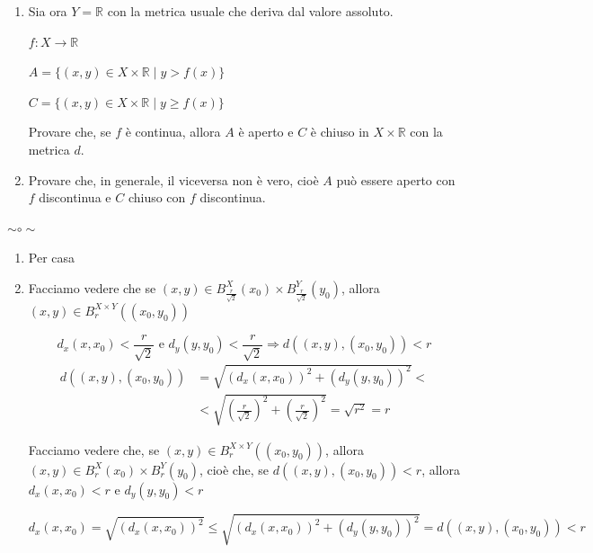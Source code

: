 \begin{exbar}
\begin{example}
\begin{enumerate}
		\item Sia ora $Y = \mathbb{R}$ con la metrica usuale che deriva dal valore assoluto.
		
		$f:X \rightarrow \mathbb{R}$
		
		$A = \{ (x,y) \in X \times \mathbb{R} \; \big| \; y > f(x) \}$
		
		$C = \{ (x,y) \in X \times \mathbb{R} \; \big| \; y \geq f(x) \}$
		
		Provare che, se $f $ è continua, allora $A$ è aperto e $C$ è chiuso in $X \times \mathbb{R}$ con la metrica $d$.
		
		\item Provare che, in generale, il viceversa non è vero, cioè $A$ può essere aperto con $f$ discontinua e $C$ chiuso con $f$ discontinua.	
	\end{enumerate}

	\begin{center}
		$\sim \circ \sim$
	\end{center}

	\begin{enumerate}
		\item Per casa
		
		\item Facciamo vedere che se $(x,y) \in B_{\frac{r}{\sqrt{2}}}^{X}(x_0) \times B_{\frac{r}{\sqrt{2}}}^{Y}(y_0)$, allora $(x, y) \in B_{r}^{X \times Y} ((x_0, y_0))$
		
		\begin{equation*}
			d_x(x, x_0) < \frac{r}{\sqrt{2}} \text{  e  } d_y(y, y_0) < \frac{r}{\sqrt{2}}
			\Rightarrow d((x,y), (x_0,y_0)) < r
		\end{equation*}
		\begin{align*}
			d((x,y),(x_0,y_0)) 
			&= \sqrt{(d_x(x, x_0))^2 + (d_y(y,y_0))^2} <
			\\
			&< \sqrt{\left( \frac{r}{\sqrt{2}} \right)^2+\left( \frac{r}{\sqrt{2}} \right)^2} = \sqrt{r^2} = r
		\end{align*}

		Facciamo vedere che, se $(x,y) \in B_{r}^{X \times Y}((x_0, y_0))$, allora $(x,y) \in B_{r}^{X} (x_0) \times B_{r}^{Y} (y_0)$, cioè che, se $d((x,y), (x_0,y_0)) < r$, allora $d_x(x, x_0) < r$ e $d_y(y, y_0) < r$
		
		\begin{equation*}
			d_x (x, x_0)= \sqrt{(d_x (x, x_0))^2} \leq \sqrt{(d_x (x, x_0))^2 + (d_y (y, y_0))^2} = d((x,y), (x_0,y_0)) < r
		\end{equation*}
	

\end{enumerate}
\end{example}
\end{exbar}
